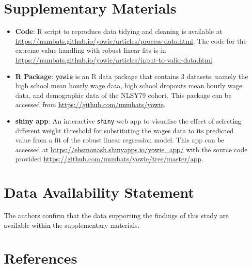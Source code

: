 \documentclass{article}
\begin{document}
\hypertarget{supplementary-materials}{%
\section{Supplementary Materials}\label{supplementary-materials}}

\begin{itemize}
\item
  \textbf{Code}: R script to reproduce data tidying and cleaning is available at \url{https://numbats.github.io/yowie/articles/process-data.html}. The code for the extreme value handling with robust linear fits is in \url{https://numbats.github.io/yowie/articles/input-to-valid-data.html}.
\item
  \textbf{R Package}: \texttt{yowie} is an R data package that contains 3 datasets, namely the high school mean hourly wage data, high school dropouts mean hourly wage data, and demographic data of the NLSY79 cohort. This package can be accessed from \url{https://github.com/numbats/yowie}.
\item
  \textbf{shiny app}: An interactive \texttt{shiny} web app to visualise the effect of selecting different weight threshold for substituting the wages data to its predicted value from a fit of the robust linear regression model. This app can be accessed at \url{https://ebsmonash.shinyapps.io/yowie_app/} with the source code provided \url{https://github.com/numbats/yowie/tree/master/app}.
\end{itemize}

\hypertarget{data-availability-statement}{%
\section{Data Availability Statement}\label{data-availability-statement}}

The authors confirm that the data supporting the findings of this study are available within the supplementary materials.

\hypertarget{references}{%
\section*{References}\label{references}}
\end{document}
